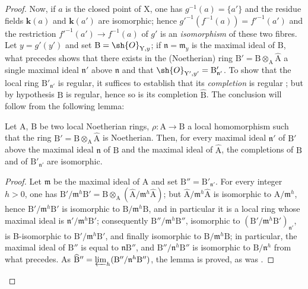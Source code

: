 \begin{proof}
Now, if $a$ is the closed point of $\mathrm{X}$, one has $g^{-1}(a)=\{a'\}$ and the residue fields $\boldsymbol{k}(a)$ and $\boldsymbol{k}(a')$ are isomorphic; hence $g'^{-1}(f^{-1}(a))=f'^{-1}(a')$ and the restriction $f'^{-1}(a')\to f^{-1}(a)$ of $g'$ is an \emph{isomorphism} of these two fibres. Let $y=g'(y')$ and set $\mathrm{B}=\sh{O}_{\mathrm{Y},y}$; if $\mathfrak{n}=\mathfrak{m}_y$ is the maximal ideal of $\mathrm{B}$, what precedes shows that there exists in the (Noetherian) ring $\mathrm{B}'=\mathrm{B}\otimes_\mathrm{A}\widehat{\mathrm{A}}$ a single maximal ideal $\mathfrak{n}'$ above $\mathfrak{n}$ and that $\sh{O}_{\mathrm{Y}',y'}=\mathrm{B}'_{\mathfrak{n}'}$. To show that the local ring $\mathrm{B}'_{\mathfrak{n}'}$ is regular, it suffices to establish that its \emph{completion} is regular ; but by hypothesis $\mathrm{B}$ is regular, hence so is its completion $\widehat{\mathrm{B}}$. The conclusion will follow from the following lemma:

\begin{lemma}[7.9.3.1]
\label{IV.7.9.3.1}
Let $\mathrm{A}$, $\mathrm{B}$ be two local Noetherian rings, $\rho:\mathrm{A}\to\mathrm{B}$ a local homomorphism such that the ring $\mathrm{B}'=\mathrm{B}\otimes_\mathrm{A}\widehat{\mathrm{A}}$ is Noetherian. Then, for every maximal ideal $\mathfrak{n}'$ of $\mathrm{B}'$ above the maximal ideal $\mathfrak{n}$ of $\mathrm{B}$ and the maximal ideal of $\widehat{\mathrm{A}}$, the completions of $\mathrm{B}$ and of $\mathrm{B}'_{\mathfrak{n}'}$ are isomorphic.
\end{lemma}

\begin{proof}
Let $\mathfrak{m}$ be the maximal ideal of $\mathrm{A}$ and set $\mathrm{B}''=\mathrm{B}'_{\mathfrak{n}'}$. For every integer $h>0$, one has $\mathrm{B}'/\mathfrak{m}^h\mathrm{B}'=\mathrm{B}\otimes_\mathrm{A}(\widehat{\mathrm{A}}/\mathfrak{m}^h\widehat{\mathrm{A}})$; but $\widehat{\mathrm{A}}/\mathfrak{m}^h\widehat{\mathrm{A}}$ is isomorphic to $\mathrm{A}/\mathfrak{m}^h$, hence $\mathrm{B}'/\mathfrak{m}^h\mathrm{B}'$ is isomorphic to $\mathrm{B}/\mathfrak{m}^h\mathrm{B}$, and in particular it is a local ring whose maximal ideal is $\mathfrak{n}'/\mathfrak{m}^h\mathrm{B}'$; consequently $\mathrm{B}''/\mathfrak{m}^h\mathrm{B}''$, isomorphic to $(\mathrm{B}'/\mathfrak{m}^h\mathrm{B}')_{\mathfrak{n}'}$, is B-isomorphic to $\mathrm{B}'/\mathfrak{m}^h\mathrm{B}'$, and finally isomorphic to $\mathrm{B}/\mathfrak{m}^h\mathrm{B}$; in particular, the maximal ideal of $\mathrm{B}''$ is equal to $\mathfrak{n}\mathrm{B}''$, and $\mathrm{B}''/\mathfrak{n}^h\mathrm{B}''$ is isomorphic to $\mathrm{B}/\mathfrak{n}^h$ from what precedes. As $\widehat{\mathrm{B}}''=\varprojlim_h(\mathrm{B}''/\mathfrak{n}^h\mathrm{B}'')$, the lemma is proved, as was .
\end{proof}
\end{proof}

